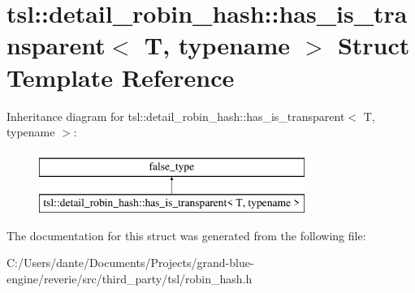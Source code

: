 \hypertarget{structtsl_1_1detail__robin__hash_1_1has__is__transparent}{}\section{tsl\+::detail\+\_\+robin\+\_\+hash\+::has\+\_\+is\+\_\+transparent$<$ T, typename $>$ Struct Template Reference}
\label{structtsl_1_1detail__robin__hash_1_1has__is__transparent}
Inheritance diagram for tsl\+::detail\+\_\+robin\+\_\+hash\+::has\+\_\+is\+\_\+transparent$<$ T, typename $>$\+:\begin{figure}[H]
\begin{center}
\leavevmode
\includegraphics[height=2.000000cm]{structtsl_1_1detail__robin__hash_1_1has__is__transparent}
\end{center}
\end{figure}


The documentation for this struct was generated from the following file\+:\begin{DoxyCompactItemize}
\item 
C\+:/\+Users/dante/\+Documents/\+Projects/grand-\/blue-\/engine/reverie/src/third\+\_\+party/tsl/robin\+\_\+hash.\+h\end{DoxyCompactItemize}
